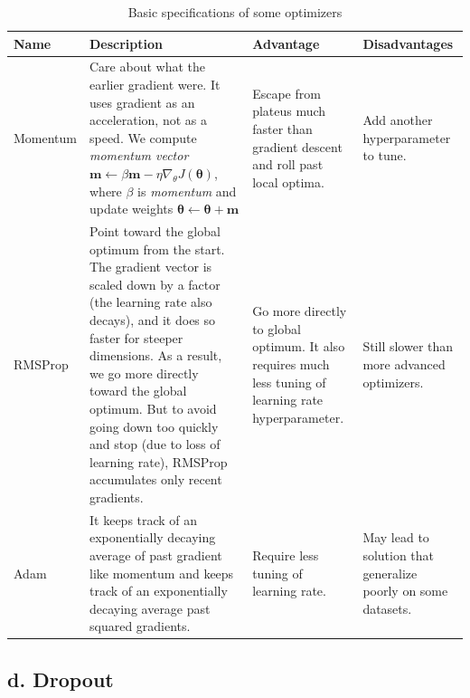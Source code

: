 \begin{table}[ht!]
	\centering
	
	\begin{tabularx}{1.0\textwidth}{ XL{0.3\textwidth}L{0.2\textwidth}L{0.2\textwidth} }
	
	\toprule
	\textbf{Name} &  \textbf{Description} & \textbf{Advantage} &\textbf{Disadvantages} \\
	
	\midrule

	Momentum & Care about what the earlier gradient were. It uses gradient as an acceleration, not as a speed.\newline
	We compute \emph{momentum vector} $\bm{m} \leftarrow \beta\bm{m} - \eta\nabla_\theta J(\bm{\theta})$, where $\beta$ is \emph{momentum} and update weights $\bm{\theta} \leftarrow \bm{\theta} + \bm{m}$ & Escape from plateus much faster than gradient descent and roll past local optima. & Add another hyperparameter to tune. \\ \addlinespace[2em] 
	
	RMSProp & Point toward the global optimum from the start. The gradient vector is scaled down by a factor (the learning rate also decays), and it does so faster for steeper dimensions. As a result, we go more directly toward the global optimum. But to avoid going down too quickly and stop (due to loss of learning rate), RMSProp accumulates only recent gradients. & Go more directly to global optimum. It also requires much less tuning of learning rate hyperparameter. & Still slower than more advanced optimizers. \\ \addlinespace[2em]
	
	Adam & It keeps track of an exponentially decaying average of past gradient like momentum and keeps track of an exponentially decaying average past squared gradients. & Require less tuning of learning rate. & May lead to solution that generalize poorly on some datasets.\\
	
	\bottomrule
	\end{tabularx}
	
	\caption{Basic specifications of some optimizers}
	\label{tab:DNN2}

\end{table}

\subsection*{d. Dropout \cite[p.~394 - 399]{Aurelien2019}}

